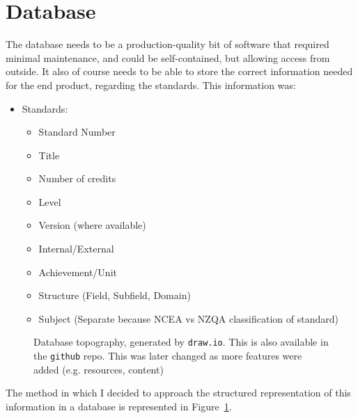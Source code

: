 \documentclass{article}
\begin{document}
\section{Database}

The database needs to be a production-quality bit of software that required minimal maintenance, and could be self-contained, but allowing access from outside. It also of course needs to be able to store the correct information needed for the end product, regarding the standards. This information was:
\begin{itemize}
    \item Standards:
        \begin{itemize}
            \item Standard Number
            \item Title
            \item Number of credits
            \item Level
            \item Version (where available)
            \item Internal/External
            \item Achievement/Unit
            \item Structure (Field, Subfield, Domain)
            \item Subject (Separate because NCEA vs NZQA classification of standard)
        \end{itemize}
\end{itemize}

\begin{figure}
    \caption{Database topography, generated by \texttt{draw.io}. This is also available in the \texttt{github} repo. This was later changed as more features were added (e.g. resources, content)}
    \label{fig:dbtopography}
\end{figure}
The method in which I decided to approach the structured representation of this information in a database is represented in Figure~\ref{fig:dbtopography}.
\end{document}
